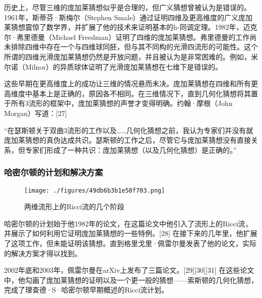 历史上，尽管三维的庞加莱猜想似乎是合理的，但广义猜想曾被认为是错误的。1961年，斯蒂芬·斯梅尔（Stephen Smale）通过证明四维及更高维度的广义庞加莱猜想震惊了数学界，并扩展了他的技术来证明基本的h-同调定理。1982年，迈克尔·弗里德曼（Michael Freedman）证明了四维的庞加莱猜想。弗里德曼的工作尚未排除四维中存在一个与四维球同胚，但与其不同构的光滑四流形的可能性。这个所谓的四维光滑庞加莱猜想仍然是开放问题，并且被认为是非常困难的。例如，米尔诺（Milnor）的异质球体证明了光滑庞加莱猜想在七维下是错误的。

这些早期在更高维度上的成功让三维的情况悬而未决。庞加莱猜想在四维和所有更高维度中基本上是正确的，原因各不相同。在三维情况下，直到几何化猜想将其置于所有3流形的框架中，庞加莱猜想的声誉才变得明确。约翰·摩根（John Morgan）写道：[27]

“在瑟斯顿关于双曲3流形的工作以及……几何化猜想之前，我认为专家们并没有就庞加莱猜想的真伪达成共识。瑟斯顿的工作之后，尽管它与庞加莱猜想没有直接关系，但专家们形成了一种共识：庞加莱猜想（以及几何化猜想）是正确的。”
\subsubsection{哈密尔顿的计划和解决方案}
\begin{figure}[ht]
\centering
\texttt{[image: ./figures/49db6b3b1e50f703.png]}
\caption{两维流形上的Ricci流的几个阶段} \label{fig_PJLCX_2}
\end{figure}
哈密尔顿的计划始于他1982年的论文，在这篇论文中他引入了流形上的Ricci流，并展示了如何利用它证明庞加莱猜想的一些特例。[28] 在接下来的几年里，他扩展了这项工作，但未能证明该猜想。直到格里戈里·佩雷尔曼发表了他的论文，实际的解决方案才得以找到。

2002年底和2003年，佩雷尔曼在arXiv上发布了三篇论文。[29][30][31] 在这些论文中，他勾画了庞加莱猜想的证明以及一个更一般的猜想——索斯顿的几何化猜想，完成了理查德·S·哈密尔顿早期概述的Ricci流计划。

